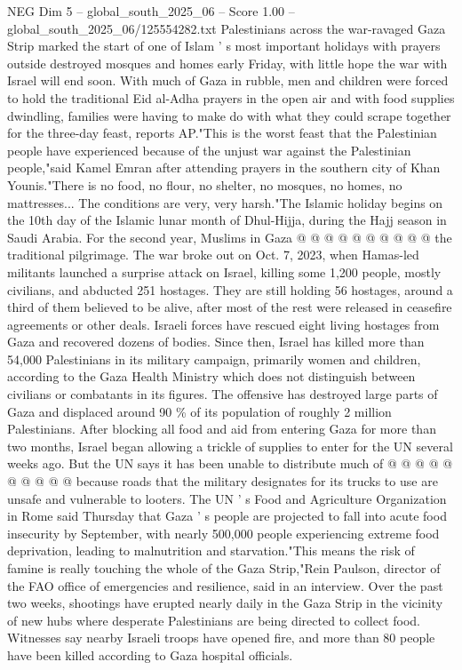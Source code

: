 \begin{textsample}{NEG Dim 5 – global\_south\_2025\_06 – Score 1.00 – global\_south\_2025\_06/125554282.txt}  \label{ex:f5_neg_398}
Palestinians across the war-ravaged Gaza Strip marked the start of one of Islam ' s most important holidays with prayers outside destroyed mosques and homes early Friday, with little hope the war with Israel will end soon.
With much of Gaza in rubble, men and children were forced to hold the traditional Eid al-Adha prayers in the open air and with food supplies dwindling, families were having to make do with what they could scrape together for the three-day feast, reports AP."This is the worst feast that the Palestinian people have experienced because of the unjust war against the Palestinian people,"said Kamel Emran after attending prayers in the southern city of Khan Younis."There is no food, no flour, no shelter, no mosques, no homes, no mattresses...
The conditions are very, very harsh."The Islamic holiday begins on the 10th day of the Islamic lunar month of Dhul-Hijja, during the Hajj season in Saudi Arabia.
For the second year, Muslims in Gaza @ @ @ @ @ @ @ @ @ @ the traditional pilgrimage.
The war broke out on Oct. 7, 2023, when Hamas-led militants launched a surprise attack on Israel, killing some 1,200 people, mostly civilians, and abducted 251 hostages.
They are still holding 56 hostages, around a third of them believed to be alive, after most of the rest were released in ceasefire agreements or other deals.
Israeli forces have rescued eight living hostages from Gaza and recovered dozens of bodies.
Since then, Israel has killed more than 54,000 Palestinians in its military campaign, primarily women and children, according to the Gaza Health Ministry which does not distinguish between civilians or combatants in its figures.
The offensive has destroyed large parts of Gaza and displaced around 90 \% of its population of roughly 2 million Palestinians.
After blocking all food and aid from entering Gaza for more than two months, Israel began allowing a trickle of supplies to enter for the UN several weeks ago.
But the UN says it has been unable to distribute much of @ @ @ @ @ @ @ @ @ @ because roads that the military designates for its trucks to use are unsafe and vulnerable to looters.
The UN ' s Food and Agriculture Organization in Rome said Thursday that Gaza ' s people are projected to fall into acute food insecurity by September, with nearly 500,000 people experiencing extreme food deprivation, leading to malnutrition and starvation."This means the risk of famine is really touching the whole of the Gaza Strip,"Rein Paulson, director of the FAO office of emergencies and resilience, said in an interview.
Over the past two weeks, shootings have erupted nearly daily in the Gaza Strip in the vicinity of new hubs where desperate Palestinians are being directed to collect food.
Witnesses say nearby Israeli troops have opened fire, and more than 80 people have been killed according to Gaza hospital officials.

\end{textsample}
